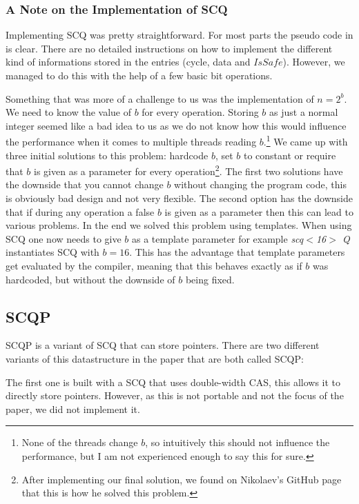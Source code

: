 \documentclass{article}      %
\begin{document}
\subsubsection{A Note on the Implementation of SCQ}
Implementing SCQ was pretty straightforward. For most parts the pseudo code in \cite{nikolaev2019scalable} is clear. There are no detailed instructions on how to implement the different kind of informations stored in the entries (cycle, data and $IsSafe$). However, we managed to do this with the help of a few basic bit operations.

Something that was more of a challenge to us was the implementation of $n= 2^b$. We need to know the value of $b$ for every operation. Storing $b$ as just a normal integer seemed like a bad idea to us as we do not know how this would influence the performance when it comes to multiple threads reading $b$.\footnote{None of the threads change $b$, so intuitively this should not influence the performance, but I am not experienced enough to say this for sure.} We came up with three initial solutions to this problem: hardcode $b$, set $b$ to constant or require that $b$ is given as a parameter for every operation\footnote{After implementing our final solution, we found on Nikolaev's GitHub page that this is how he solved this problem.}. The first two solutions have the downside that you cannot change $b$ without changing the program code, this is obviously bad design and not very flexible. The second option has the downside that if during any operation a false $b$ is given as a parameter then this can lead to various problems. In the end we solved this problem using templates. When using SCQ one now needs to give $b$ as a template parameter for example  \textit{scq$<$16$>$ Q} instantiates SCQ with $b=16$. This has the advantage that template parameters get evaluated by the compiler, meaning that this behaves exactly as if $b$ was hardcoded, but without the downside of $b$ being fixed.

\subsection{SCQP}
\label{sec:SCQP}
SCQP is a variant of SCQ that can store pointers. There are two different variants of this datastructure in the paper that are both called SCQP:

The first one is built with a SCQ that uses double-width CAS, this allows it to directly store pointers. However, as this is not portable and not the focus of the paper, we did not implement it. 
\end{document}
